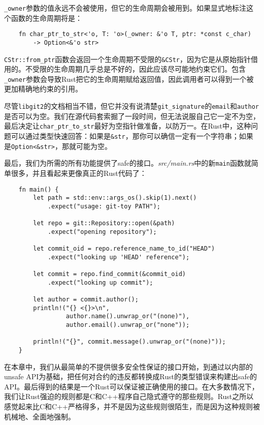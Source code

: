 \texttt{\_owner}参数的值永远不会被使用，但它的生命周期会被用到。如果显式地标注这个函数的生命周期将是：
\begin{verbatim}
    fn char_ptr_to_str<'o, T: 'o>(_owner: &'o T, ptr: *const c_char)
        -> Option<&'o str>
\end{verbatim}

\texttt{CStr::from\_ptr}函数会返回一个生命周期不受限的\texttt{\&CStr}，因为它是从原始指针借用的。不受限的生命周期几乎总是不好的，因此应该尽可能地约束它们。包含\texttt{\_owner}参数会导致Rust把它的生命周期赋给返回值，因此调用者可以得到一个被更加精确地约束的引用。

尽管\texttt{libgit2}的文档相当不错，但它并没有说清楚\texttt{git\_signature}的\texttt{email}和\texttt{author}是否可以为空。我们在源代码套索掘了一段时间，但无法说服自己它一定不为空，最后决定让\texttt{char\_ptr\_to\_str}最好为空指针做准备，以防万一。在Rust中，这种问题可以通过类型快速回答：如果是\texttt{\&str}，那你可以确信一定有一个字符串；如果是\texttt{Option<\&str>}，那就可能为空。

最后，我们为所需的所有功能提供了safe的接口。\emph{src/main.rs}中的新\texttt{main}函数就简单很多，并且看起来更像真正的Rust代码了：
\begin{verbatim}
    fn main() {
        let path = std::env::args_os().skip(1).next()
            .expect("usage: git-toy PATH");

        let repo = git::Repository::open(&path)
            .expect("opening repository");
        
        let commit_oid = repo.reference_name_to_id("HEAD")
            .expect("looking up 'HEAD' reference");
        
        let commit = repo.find_commit(&commit_oid)
            .expect("looking up commit");
        
        let author = commit.author();
        println!("{} <{}>\n",
                 author.name().unwrap_or("(none)"),
                 author.email().unwrap_or("none"));
        
        println!("{}", commit.message().unwrap_or("(none)"));
    }
\end{verbatim}

在本章中，我们从最简单的不提供很多安全性保证的接口开始，到通过以内部的unsafe API为基础，把任何对合约的违反都转换成Rust的类型错误来构建出safe的API。最后得到的结果是一个Rust可以保证被正确使用的接口。在大多数情况下，我们让Rust强迫的规则都是C和C++程序自己隐式遵守的那些规则。Rust之所以感觉起来比C和C++严格得多，并不是因为这些规则很陌生，而是因为这种规则被机械地、全面地强制。

